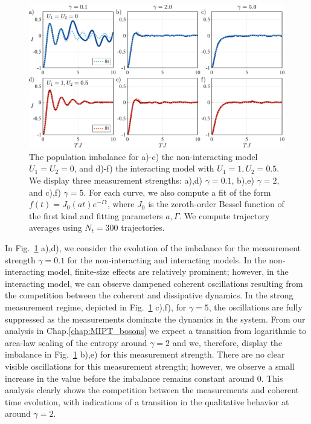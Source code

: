 \begin{figure}[ht]
    \centering
    \includegraphics[width=\textwidth]{Chapters/Plots/Chapter6/Chapter5_Fig2.pdf}
    \caption{The population imbalance for a)-c) the non-interacting model $U_1 = U_2 = 0$, and d)-f) the interacting model with $U_1 = 1, U_2 = 0.5$. We display three measurement strengths: a),d) $\gamma=0.1$, b),e) $\gamma=2$, and c),f) $\gamma=5$. For each curve, we also compute a fit of the form $f(t) = J_0(at) e^{-\Gamma t}$, where $J_0$ is the zeroth-order Bessel function of the first kind and fitting parameters $a, \Gamma$. We compute trajectory averages using $N_t = 300$ trajectories.}
    \label{fig:Chapter5_Fig2}
\end{figure}

In Fig.~\ref{fig:Chapter5_Fig2} a),d), we consider the evolution of the imbalance for the measurement strength $\gamma = 0.1$ for the non-interacting and interacting models. In the non-interacting model, finite-size effects are relatively prominent; however, in the interacting model, we can observe dampened coherent oscillations resulting from the competition between the coherent and dissipative dynamics. In the strong measurement regime, depicted in Fig.~\ref{fig:Chapter5_Fig2} c),f), for $\gamma = 5$, the oscillations are fully suppressed as the measurements dominate the dynamics in the system. From our analysis in Chap.\ref{chap:MIPT_bosons} we expect a transition from logarithmic to area-law scaling of the entropy around $\gamma = 2$ and we, therefore, display the imbalance in Fig.~\ref{fig:Chapter5_Fig2} b),e) for this measurement strength. There are no clear visible oscillations for this measurement strength; however, we observe a small increase in the value before the imbalance remains constant around $0$. This analysis clearly shows the competition between the measurements and coherent time evolution, with indications of a transition in the qualitative behavior at around $\gamma = 2$. 

